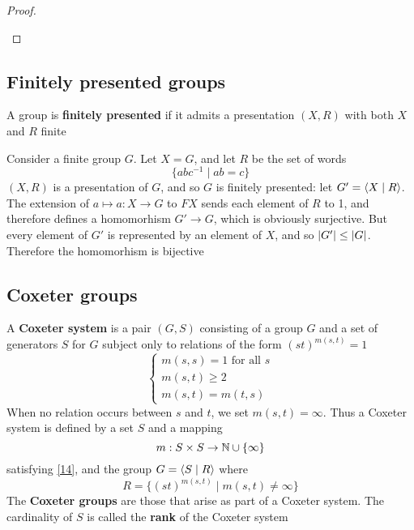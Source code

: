 \documentclass[11pt]{article}
\begin{document}
\begin{proof}
\begin{center}\end{center}
\end{proof}
\subsection{Finitely presented groups}
\label{sec:orgd961428}

A group is \textbf{finitely presented} if it admits a presentation \((X,R)\) with both \(X\) and \(R\)
finite

\begin{examplle}[]
Consider a finite group \(G\). Let \(X=G\), and let \(R\) be the set of words
\begin{equation*}
\{abc^{-1}\mid ab=c\}
\end{equation*}
\((X,R)\) is a presentation of \(G\), and so \(G\) is finitely presented: let \(G'=\langle X\mid R\rangle\).
The extension of \(a\mapsto a:X\to G\) to \(FX\) sends each element of \(R\) to 1, and therefore defines
a homomorhism \(G'\to G\), which is obviously surjective. But every element of \(G'\) is
represented by an element of \(X\), and so \(\abs{G'}\le\abs{G}\). Therefore the homomorhism is bijective
\end{examplle}
\subsection{Coxeter groups}
\label{sec:org3e5b2e6}
A \textbf{Coxeter system} is a pair \((G,S)\) consisting of a group \(G\) and a set of generators \(S\)
for \(G\) subject only to relations of the form \((st)^{m(s,t)}=1\)
\begin{equation}
\label{14}
\begin{cases}
m(s,s)=1\text{ for all }s\\
m(s,t)\ge 2\\
m(s,t)=m(t,s)
\end{cases}
\end{equation}
When no relation occurs between \(s\) and \(t\), we set \(m(s,t)=\infty\). Thus a Coxeter system is
defined by a set \(S\) and a mapping
\begin{equation*}
m:S\times S\to\mathbb{N}\cup\{\infty\}
\end{equation*}
satisfying \eqref{14}, and the group \(G=\langle S\mid R\rangle\) where
\begin{equation*}
R=\{(st)^{m(s,t)}\mid m(s,t)\neq\infty\}
\end{equation*}
The \textbf{Coxeter groups} are those that arise as part of a Coxeter system. The cardinality of \(S\) is
called the \textbf{rank} of the Coxeter system
\end{document}
